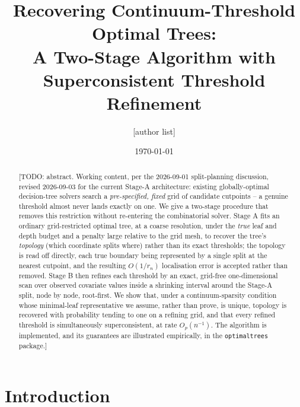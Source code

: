 \documentclass[11pt]{article}
\title{Recovering Continuum-Threshold Optimal Trees:\\[2pt]
  \large A Two-Stage Algorithm with Superconsistent Threshold Refinement}
\author{[author list]}
\date{\today}
\theoremstyle{plain}
\theoremstyle{definition}
\theoremstyle{remark}
\begin{document}
\maketitle

\begin{abstract}
[TODO: abstract. Working content, per the 2026-09-01 split-planning
discussion, revised 2026-09-03 for the current Stage-A architecture:
existing globally-optimal decision-tree solvers search a
\emph{pre-specified, fixed} grid of candidate cutpoints -- a genuine
threshold almost never lands exactly on one. We give a two-stage procedure
that removes this restriction without re-entering the combinatorial solver.
Stage A fits an ordinary grid-restricted optimal tree, at a coarse
resolution, under the \emph{true} leaf and depth budget and a penalty large
relative to the grid mesh, to recover the tree's \emph{topology} (which
coordinate splits where) rather than its exact thresholds; the topology is
read off directly, each true boundary being represented by a single split at
the nearest cutpoint, and the resulting $O(1/r_n)$ localisation error is
accepted rather than removed. Stage B then refines each threshold by an
exact, grid-free
one-dimensional scan over observed covariate values inside a shrinking
interval around the Stage-A split, node by node,
root-first. We show that, under a continuum-sparsity condition whose
minimal-leaf representative we assume, rather than prove, is unique, topology
is recovered with probability tending to one on a refining grid, and that
every refined threshold is simultaneously superconsistent, at rate
$O_p(n^{-1})$. The algorithm is implemented, and its
guarantees are illustrated empirically, in the \texttt{optimaltrees} package.]
\end{abstract}

\tableofcontents

\section{Introduction}\label{sec:intro}
\end{document}
